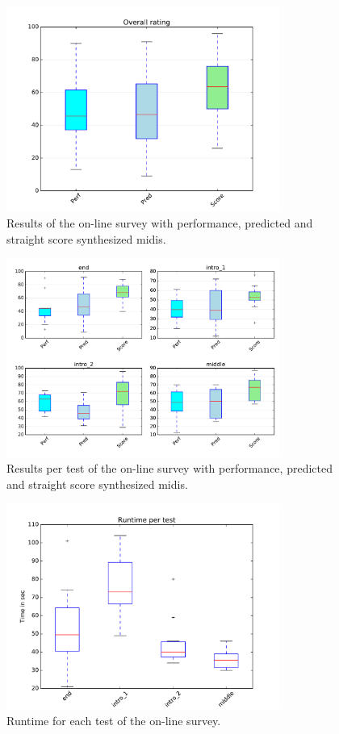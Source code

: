 \begin{appendices}


\begin{figure}
\caption{Results of the on-line survey with performance, predicted and straight score synthesized midis.}
\label{fig_app:survey}
\centering
\includegraphics[width=0.8\textwidth]{Figures/survey.pdf}
\end{figure}

\begin{figure}
\caption{Results per test of the on-line survey with performance, predicted and straight score synthesized midis.}
\label{fig_app:survey_test2}
\centering
\includegraphics[width=0.8\textwidth]{Figures/survey_tests.pdf}
\end{figure}

\begin{figure}
\caption{Runtime for each test of the on-line survey.}
\label{fig_app:survey_runtime}
\centering
\includegraphics[width=0.8\textwidth]{Figures/survey_runtime.pdf}
\end{figure}

\cleardoublepage

\end{appendices}


